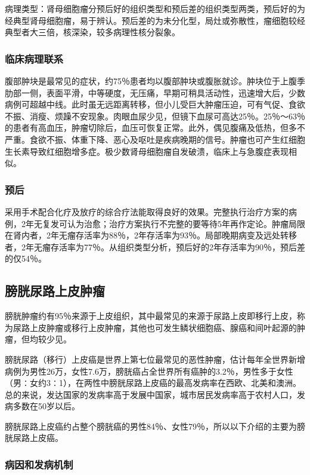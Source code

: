 病理类型：肾母细胞瘤分预后好的组织类型和预后差的组织类型两类，预后好的为经典型肾母细胞瘤，易于辨认。预后差的为未分化型，局灶或弥散性，瘤细胞较经典型者大三倍，核深染，较多病理性核分裂象。

\subsubsection{临床病理联系}

腹部肿块是最常见的症状，约75％患者均以腹部肿块或腹胀就诊。肿块位于上腹季肋部一侧，表面平滑，中等硬度，无压痛，早期可稍具活动性，迅速增大后，少数病例可超越中线。此时虽无远距离转移，但小儿受巨大肿瘤压迫，可有气促、食欲不振、消瘦、烦躁不安现象。肉眼血尿少见，但镜下血尿可高达25％。25％～63％的患者有高血压，肿瘤切除后，血压可恢复正常。此外，偶见腹痛及低热，但多不严重。食欲不振、体重下降、恶心及呕吐是疾病晚期的信号。肿瘤也可产生红细胞生长素导致红细胞增多症。极少数肾母细胞瘤自发破溃，临床上与急腹症表现相似。

\subsubsection{预后}

采用手术配合化疗及放疗的综合疗法能取得良好的效果。完整执行治疗方案的病例，2年无复发可认为治愈；治疗方案执行不完整的要等待5年再作定论。肿瘤局限在肾内者，2年无瘤存活率为88％，2年存活率为93％。局部晚期病变及远处转移者，2年无瘤存活率为77％。从组织类型分析，预后好的2年存活率为90％，预后差的仅54％。

\subsection{膀胱尿路上皮肿瘤}

膀胱肿瘤约有95％来源于上皮组织，其中最常见的来源于尿路上皮即移行上皮，称为尿路上皮肿瘤或移行上皮肿瘤，其他也可发生鳞状细胞癌、腺癌和间叶起源的肿瘤，但均较少见。

膀胱尿路（移行）上皮癌是世界上第七位最常见的恶性肿瘤，估计每年全世界新增病例为男性26万，女性7.6万，膀胱癌占全世界所有癌肿的3.2％，男性多于女性（男∶女约3∶1），在两性中膀胱尿路上皮癌的最高发病率在西欧、北美和澳洲。总的来说，发达国家的发病率高于发展中国家，城市居民发病率高于农村人口，发病多数在50岁以后。

膀胱尿路上皮癌约占整个膀胱癌的男性84％、女性79％，所以以下介绍的主要为膀胱尿路上皮癌。

\subsubsection{病因和发病机制}

